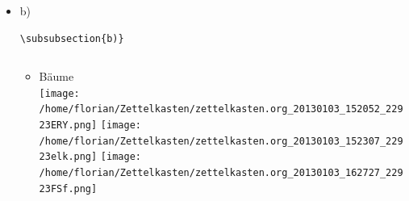 \documentclass[11pt]{article}
\begin{document}
\begin{itemize}
\begin{verbatim}
$G_j = \{ (j,\omega_2,\omega_3) | \omega_2 \in \{ 1,2,3 \}, \omega_3 \in \{ 1,2,3 \} \backslash  \{ j , \omega_2 \} \}$ \\
        $= \{ \omega \in \Omega | \omega_1 = j \wedge \omega_3 \not = j \wedge \omega_3 \not = \omega_2\ \wedge \omega_3 \not = j \}$ \\
$W_k = \{ ( \omega_1 , k , \omega_3 ) | \omega_1 \in \{ 1,2,3 \} , \omega_3 \in \{ 1, 2, 3 \} \backslash \{\omega_1 , k \} \}$ \\
     $= \{ \omega \in \Omega | \omega_2 = k \wedge \omega_3 \not = k \wedge \omega_3 \not = \omega_1 \wedge \omega_3 \not = k \}$ \\
$M_l = \{ ( \omega_1 , \omega_2 , l ) | \omega_1 \in \{ 1,2,3 \} \backslash \{ l \} , \omega_2 \in \{ 1, 2, 3 \}  \backslash \{ l \} , l \}$ \\
     $= \{ \omega \in \Omega | \omega_1 \not = l \wedge \omega_2 \not = l \wedge \omega_3 = l \}$ \\

$P(G_j | W_k \cap M_l, 1 \leq j,k,l \leq 3) = \frac{P( M_l | W_k , G_j) P(G_j | W_k)}{P(M_l | W_k)}$ \\
$P(M_l | W_k , G_j ) = 1$ , für l \not = k und l \not = j, was immer der Fall ist
$P(G_j | W_k) = \frac{1}{3}$ , da es keine Beeinflussung durch W_k gibt
$P(M_l | W_k) = \frac{1}{2}$ , da für l nur noch 2 Werte bleiben
$P(G_j | W_k , M_l) = \frac{1 * \frac{1}{3}}{\frac{1}{2}} = \frac{2}{3}$

Der Spieler sollte die Tür also auf jeden Fall wechseln, da die Wahrscheinlichkeit, dass der Gewinn
hinter der anderen Tür liegt, bei 2/3 liegt, wohingegen, die Wahrscheinlichkeit der jetztigen Tür
nur bei 1/3 liegt.
\end{verbatim}


\item b)\\
\label{sec-3-8-6-2}%
\begin{verbatim}
\subsubsection{b)}
\end{verbatim}


\begin{verbatim}

\end{verbatim}
\begin{itemize}

\item Bäume\\
\label{sec-3-8-6-2-1}%
\texttt{[image: /home/florian/Zettelkasten/zettelkasten.org\_20130103\_152052\_22923ERY.png]}
\texttt{[image: /home/florian/Zettelkasten/zettelkasten.org\_20130103\_152307\_22923elk.png]}
\texttt{[image: /home/florian/Zettelkasten/zettelkasten.org\_20130103\_162727\_22923FSf.png]}


\end{itemize}
\end{itemize}
\end{document}

